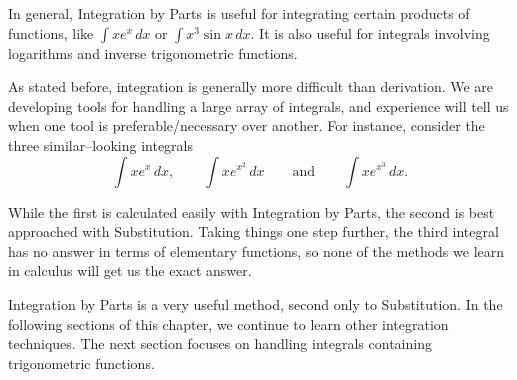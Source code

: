 In general, Integration by Parts is useful for integrating certain products of functions, like $\int x e^x\,dx$ or $\int x^3\sin x\,dx$.   It is also useful for integrals involving logarithms and inverse trigonometric functions.  

As stated before, integration is generally more difficult than derivation. We are developing tools for handling a large array of integrals, and experience will tell us when one tool is preferable/necessary over another. For instance, consider the three similar--looking integrals 
\[
\int xe^x\,dx, \qquad  \int x e^{x^2}\,dx \qquad \text{and} \qquad \int xe^{x^3}\,dx.
\]

While the first is calculated easily with Integration by Parts, the second is best approached with Substitution.  Taking things one step further, the third integral has no answer in terms of elementary functions, so none of the methods we learn in calculus will get us the exact answer.

Integration by Parts is a very useful method, second only to Substitution. In the following sections of this chapter, we continue to learn other integration techniques. The next section focuses on handling integrals containing trigonometric functions. 




